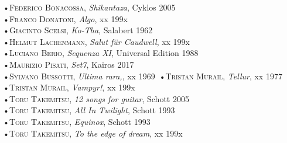 \documentclass[oneside]{article}
\begin{document}
\begin{multicols*}{2}
•\textsc{\textsf {Federico Bonacossa}}, \emph{Shikantaza}, Cyklos 2005\\
•\textsc{\textsf {Franco Donatoni}}, \emph{Algo}, xx 199x\\
•\textsc{\textsf {Giacinto Scelsi}}, \emph{Ko-Tha}, Salabert 1962\\
•\textsc{\textsf {Helmut Lachenmann}}, \emph{Salut für Caudwell}, xx 199x\\
•\textsc{\textsf {Luciano Berio}}, \emph{Sequenza XI}, Universal Edition 1988\\
•\textsc{\textsf {Maurizio Pisati}}, \emph{Set7}, Kairos 2017\\
•\textsc{\textsf {Sylvano Bussotti}}, \emph{Ultima rara,}, xx 1969\
•\textsc{\textsf {Tristan Murail}}, \emph{Tellur}, xx 1977\\
•\textsc{\textsf {Tristan Murail}}, \emph{Vampyr!}, xx 199x\\
•\textsc{\textsf {Toru Takemitsu}}, \emph{12 songs for guitar}, Schott 2005\\
•\textsc{\textsf {Toru Takemitsu}}, \emph{All In Twilight}, Schott 1993\\
•\textsc{\textsf {Toru Takemitsu}}, \emph{Equinox}, Schott 1993\\
•\textsc{\textsf {Toru Takemitsu}}, \emph{To the edge of dream}, xx 199x\\


\vfill\null
\columnbreak



\end{multicols*}
\end{document}
